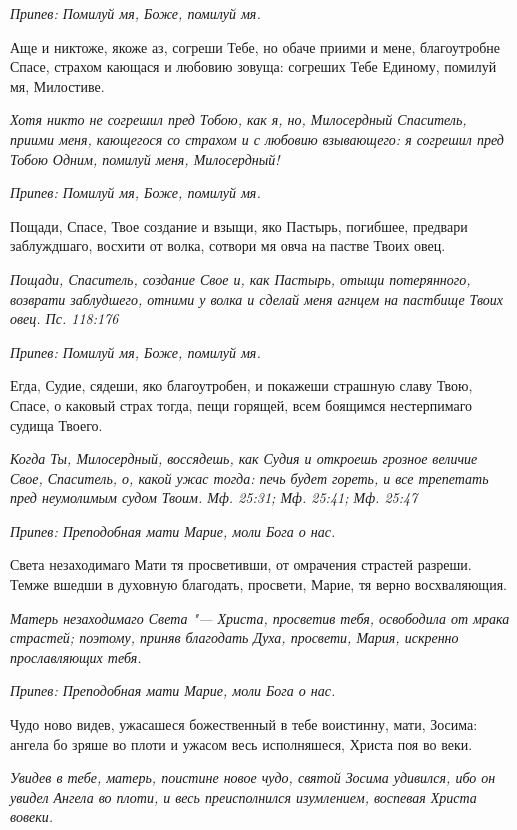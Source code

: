 \itshape Припев:\normalfont{} Помилуй мя, Боже, помилуй мя.


Аще и никтоже, якоже аз, согреши Тебе, но обаче приими и мене, благоутробне Спасе, страхом кающася и любовию зовуща: согреших Тебе Единому, помилуй мя, Милостиве.


\itshape Хотя никто не согрешил пред Тобою, как я, но, Милосердный Спаситель, приими меня, кающегося со страхом и с любовию взывающего: я согрешил пред Тобою Одним, помилуй меня, Милосердный!\normalfont{}


\itshape Припев:\normalfont{} Помилуй мя, Боже, помилуй мя.


Пощади, Спасе, Твое создание и взыщи, яко Пастырь, погибшее, предвари заблуждшаго, восхити от волка, сотвори мя овча на пастве Твоих овец.


\itshape Пощади, Спаситель, создание Свое и, как Пастырь, отыщи потерянного, возврати заблудшего, отними у волка и сделай меня агнцем на пастбище Твоих овец. Пс. 118:176\normalfont{}


\itshape Припев:\normalfont{} Помилуй мя, Боже, помилуй мя.


Егда, Судие, сядеши, яко благоутробен, и покажеши страшную славу Твою, Спасе, о каковый страх тогда, пещи горящей, всем боящимся нестерпимаго судища Твоего.


\itshape Когда Ты, Милосердный, воссядешь, как Судия и откроешь грозное величие Свое, Спаситель, о, какой ужас тогда: печь будет гореть, и все трепетать пред неумолимым судом Твоим. Мф. 25:31; Мф. 25:41; Мф. 25:47\normalfont{}


\itshape Припев:\normalfont{} Преподобная мати Марие, моли Бога о нас.


Света незаходимаго Мати тя просветивши, от омрачения страстей разреши. Темже вшедши в духовную благодать, просвети, Марие, тя верно восхваляющия.


\itshape Матерь незаходимаго Света "--- Христа, просветив тебя, освободила от мрака страстей; поэтому, приняв благодать Духа, просвети, Мария, искренно прославляющих тебя.\normalfont{}


\itshape Припев:\normalfont{} Преподобная мати Марие, моли Бога о нас.


Чудо ново видев, ужасашеся божественный в тебе воистинну, мати, Зосима: ангела бо зряше во плоти и ужасом весь исполняшеся, Христа поя во веки.


\itshape Увидев в тебе, матерь, поистине новое чудо, святой Зосима удивился, ибо он увидел Ангела во плоти, и весь преисполнился изумлением, воспевая Христа вовеки.\normalfont{}


